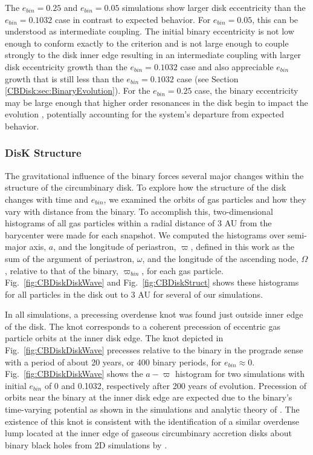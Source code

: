 The $e_{bin} = 0.25$ and $e_{bin} = 0.05$ simulations show larger disk eccentricity than
the $e_{bin} = 0.1032$ case in contrast to expected behavior.  For
$e_{bin} = 0.05$, this can be understood as intermediate coupling.
The initial binary eccentricity is not low enough to conform exactly
to the \citet{Papaloizou2001} criterion and is not large enough to
couple strongly to the disk inner edge resulting in an intermediate
coupling with larger disk eccentricity growth than the $e_{bin} = 0.1032$ case and also
appreciable $e_{bin}$ growth that is still less than the $e_{bin} = 0.1032$ case (see Section \ref{CBDisk:sec:BinaryEvolution}).  For
the $e_{bin} = 0.25$ case, the binary eccentricity may be large enough that higher order resonances in the disk begin to impact the evolution \citep{Artymowicz1992}, potentially accounting for the system's departure from expected behavior.


\subsubsection{DisK Structure} \label{CBDisk:sec:discStructEvolution}

The gravitational influence of the binary forces several major changes within the structure of the circumbinary disk.  To explore how the
structure of the disk changes with time and $e_{bin}$, we examined the orbits of gas
particles and how they vary with distance from the binary.  To
accomplish this, two-dimensional histograms of all gas particles
within a radial distance of 3 AU from the barycenter were made for
each snapshot.  We computed the histograms over semi-major
axis, $a$, and the longitude of periastron, $\varpi$, defined in this
work as the sum of the argument of periastron, $\omega$, and the
longitude of the ascending node, $\Omega$, relative to that of the binary, $\varpi_{bin}$, for each gas particle. 
Fig.~\ref{fig:CBDiskDiskWave} and Fig.~\ref{fig:CBDiskStruct} shows these histograms
for all particles in the disk out to 3 AU
for several of our simulations.

In all simulations, a precessing overdense knot was found just outside
inner edge of the disk.  The knot corresponds to a coherent precession
of eccentric gas particle orbits at the inner disk edge.  The knot
depicted in Fig.~\ref{fig:CBDiskDiskWave} precesses relative to the binary
in the prograde sense with a period of about 20 years, or 400 binary
periods, for $e_{bin} \approx 0$.
Fig.~\ref{fig:CBDiskDiskWave} shows the $a - \varpi$ histogram 
for two simulations with initial $e_{bin}$ of 0 and 0.1032,
respectively after 200 years of evolution.
Precession of orbits near the binary at the inner disk edge are expected due to the binary's time-varying potential as shown in the simulations and analytic theory of \citet{Artymowicz2000}. The existence of this knot is consistent with the identification of a similar overdense lump located at the inner edge of 
gaseous circumbinary accretion disks about binary black holes from 2D simulations by \citet{Farris2014}.

